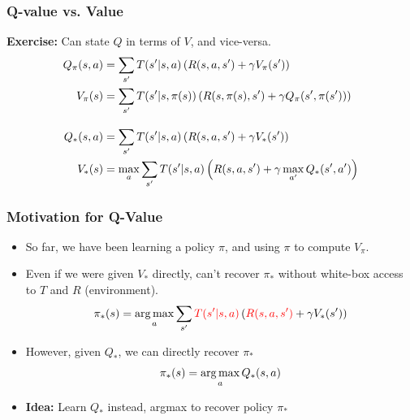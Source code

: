 \begin{frame}
	\frametitle{Q-value vs. Value}
	
\textbf{Exercise:} Can state $Q$ in terms of $V$, and vice-versa.
\begin{align*}
Q_\pi(s,a) &= \sum_{s'} T(s' | s,a) \left( R(s,a,s') + \gamma V_\pi(s') \right) \\
V_\pi(s) &= \sum_{s'} T(s' | s, \pi(s)) \left( R(s,\pi(s),s') 
	+ \gamma Q_\pi(s', \pi(s')) \right) \\
	\intertext{\quad}
	Q_*(s,a) &= \sum_{s'} T(s' | s,a) \left( R(s,a,s') + \gamma V_*(s') \right) \\
	V_*(s) &= \max_a \sum_{s'} T(s' | s, a) \left( R(s,a,s') 
	+ \gamma \max_{a'} Q_*(s', a') \right) \\
\end{align*}

\end{frame}


\begin{frame}
	\frametitle{Motivation for Q-Value}
\begin{itemize}
\item So far, we have been learning a policy $\pi$, and using
$\pi$ to compute $V_\pi$.
\pause
\item Even if we were given $V_*$ directly,
can't recover $\pi_*$ without white-box access to $T$ and $R$ (environment).
$$
\pi_*(s) = \operatorname*{arg\,max}_a \sum_{s'} \textcolor{red}{T(s'| s, a)} \left( 
\textcolor{red}{R(s,a,s')} + 
\gamma V_*(s') \right)
$$  \pause
		\item However, given $Q_*$, we can directly recover $\pi_*$
		$$
		\pi_*(s) = \operatorname*{arg\,max}_a Q_*(s,a)
		$$
		\pause
		\item \textbf{Idea:} Learn $Q_*$ instead, argmax to recover policy $\pi_*$
\end{itemize}
\end{frame}

